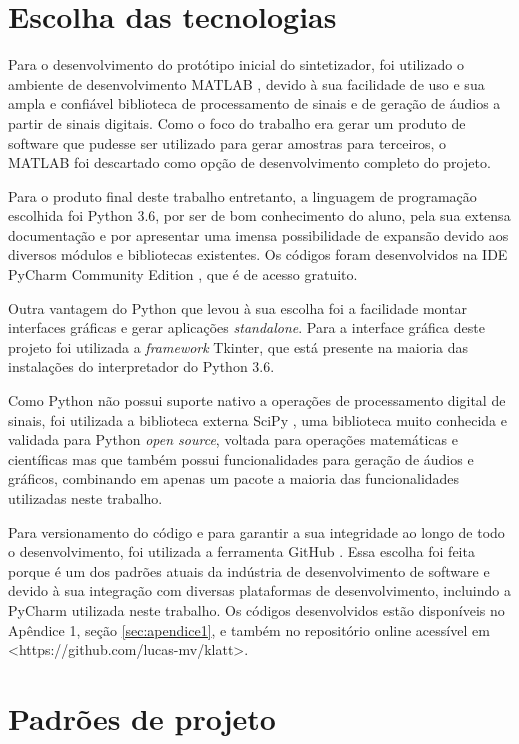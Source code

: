 \documentclass[
  12pt,       
  openright,      
  twoside,      
  a4paper,      
  english,      
  french,       
  spanish,      
  brazil,     
  ]{abntex2}
\begin{document}
\section{Escolha das tecnologias}
Para o desenvolvimento do protótipo inicial do sintetizador, foi utilizado o ambiente de desenvolvimento MATLAB \cite{matlab}, devido à sua facilidade de uso e sua ampla e confiável biblioteca de processamento de sinais e de geração de áudios a partir de sinais digitais. Como o foco do trabalho era gerar um produto de software que pudesse ser utilizado para gerar amostras para terceiros, o MATLAB foi descartado como opção de desenvolvimento completo do projeto.

Para o produto final deste trabalho entretanto, a linguagem de programação escolhida foi Python 3.6, por ser de bom conhecimento do aluno, pela sua extensa documentação e por apresentar uma imensa possibilidade de expansão devido aos diversos módulos e bibliotecas existentes. Os códigos foram desenvolvidos na IDE PyCharm Community Edition \cite{pycharm}, que é de acesso gratuito.

Outra vantagem do Python que levou à sua escolha foi a facilidade montar interfaces gráficas e gerar aplicações \textit{standalone}. Para a interface gráfica deste projeto foi utilizada a \textit{framework} Tkinter, que está presente na maioria das instalações do interpretador do Python 3.6.

Como Python não possui suporte nativo a operações de processamento digital de sinais, foi utilizada a biblioteca externa SciPy \cite{scipy}, uma biblioteca muito conhecida e validada para Python \textit{open source}, voltada para operações matemáticas e científicas mas que também possui funcionalidades para geração de áudios e gráficos, combinando em apenas um pacote a maioria das funcionalidades utilizadas neste trabalho.

Para versionamento do código e para garantir a sua integridade ao longo de todo o desenvolvimento, foi utilizada a ferramenta GitHub \cite{github}. Essa escolha foi feita porque é um dos padrões atuais da indústria de desenvolvimento de software e devido à sua integração com diversas plataformas de desenvolvimento, incluindo a PyCharm \cite{pycharm} utilizada neste trabalho. Os códigos desenvolvidos estão disponíveis no Apêndice 1, seção \ref{sec:apendice1}, e também no repositório online acessível em <https://github.com/lucas-mv/klatt>.

\section{Padrões de projeto}
\label{subsec:padroesProjeto}
\end{document}
